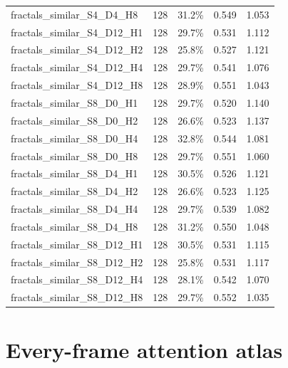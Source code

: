 \documentclass[11pt]{article}
\begin{document}
\begin{longtable}{p{}rrrr}
fractals\_\allowbreak{}similar\_\allowbreak{}S4\_\allowbreak{}D4\_\allowbreak{}H8 & 128 & 31.2\% & 0.549 & 1.053\\
fractals\_\allowbreak{}similar\_\allowbreak{}S4\_\allowbreak{}D12\_\allowbreak{}H1 & 128 & 29.7\% & 0.531 & 1.112\\
fractals\_\allowbreak{}similar\_\allowbreak{}S4\_\allowbreak{}D12\_\allowbreak{}H2 & 128 & 25.8\% & 0.527 & 1.121\\
fractals\_\allowbreak{}similar\_\allowbreak{}S4\_\allowbreak{}D12\_\allowbreak{}H4 & 128 & 29.7\% & 0.541 & 1.076\\
fractals\_\allowbreak{}similar\_\allowbreak{}S4\_\allowbreak{}D12\_\allowbreak{}H8 & 128 & 28.9\% & 0.551 & 1.043\\
fractals\_\allowbreak{}similar\_\allowbreak{}S8\_\allowbreak{}D0\_\allowbreak{}H1 & 128 & 29.7\% & 0.520 & 1.140\\
fractals\_\allowbreak{}similar\_\allowbreak{}S8\_\allowbreak{}D0\_\allowbreak{}H2 & 128 & 26.6\% & 0.523 & 1.137\\
fractals\_\allowbreak{}similar\_\allowbreak{}S8\_\allowbreak{}D0\_\allowbreak{}H4 & 128 & 32.8\% & 0.544 & 1.081\\
fractals\_\allowbreak{}similar\_\allowbreak{}S8\_\allowbreak{}D0\_\allowbreak{}H8 & 128 & 29.7\% & 0.551 & 1.060\\
fractals\_\allowbreak{}similar\_\allowbreak{}S8\_\allowbreak{}D4\_\allowbreak{}H1 & 128 & 30.5\% & 0.526 & 1.121\\
fractals\_\allowbreak{}similar\_\allowbreak{}S8\_\allowbreak{}D4\_\allowbreak{}H2 & 128 & 26.6\% & 0.523 & 1.125\\
fractals\_\allowbreak{}similar\_\allowbreak{}S8\_\allowbreak{}D4\_\allowbreak{}H4 & 128 & 29.7\% & 0.539 & 1.082\\
fractals\_\allowbreak{}similar\_\allowbreak{}S8\_\allowbreak{}D4\_\allowbreak{}H8 & 128 & 31.2\% & 0.550 & 1.048\\
fractals\_\allowbreak{}similar\_\allowbreak{}S8\_\allowbreak{}D12\_\allowbreak{}H1 & 128 & 30.5\% & 0.531 & 1.115\\
fractals\_\allowbreak{}similar\_\allowbreak{}S8\_\allowbreak{}D12\_\allowbreak{}H2 & 128 & 25.8\% & 0.531 & 1.117\\
fractals\_\allowbreak{}similar\_\allowbreak{}S8\_\allowbreak{}D12\_\allowbreak{}H4 & 128 & 28.1\% & 0.542 & 1.070\\
fractals\_\allowbreak{}similar\_\allowbreak{}S8\_\allowbreak{}D12\_\allowbreak{}H8 & 128 & 29.7\% & 0.552 & 1.035\\
\bottomrule\end{longtable}\normalsize\section{Every-frame attention atlas}
\end{document}
